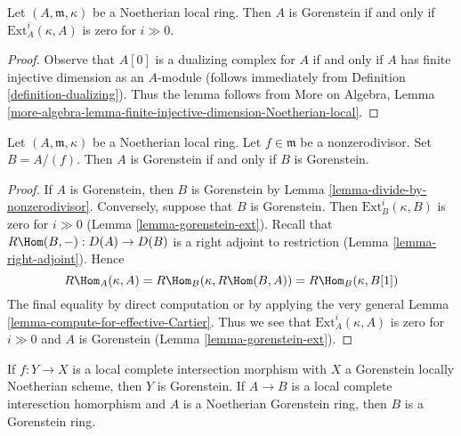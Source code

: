 \begin{lemma}
\label{lemma-gorenstein-ext}
Let $(A, \mathfrak m, \kappa)$ be a Noetherian local ring.
Then $A$ is Gorenstein if and only if $\text{Ext}^i_A(\kappa, A)$
is zero for $i \gg 0$.
\end{lemma}

\begin{proof}
Observe that $A[0]$ is a dualizing complex for $A$ if and only
if $A$ has finite injective dimension as an $A$-module
(follows immediately from Definition \ref{definition-dualizing}).
Thus the lemma follows from More on Algebra, Lemma
\ref{more-algebra-lemma-finite-injective-dimension-Noetherian-local}.
\end{proof}

\begin{lemma}
\label{lemma-gorenstein-divide-by-nonzerodivisor}
Let $(A, \mathfrak m, \kappa)$
be a Noetherian local ring. Let $f \in \mathfrak m$ be a
nonzerodivisor. Set $B = A/(f)$. Then $A$ is Gorenstein if and
only if $B$ is Gorenstein.
\end{lemma}

\begin{proof}
If $A$ is Gorenstein, then $B$ is Gorenstein by
Lemma \ref{lemma-divide-by-nonzerodivisor}.
Conversely, suppose that $B$ is Gorenstein. Then
$\text{Ext}^i_B(\kappa, B)$ is zero for $i \gg 0$
(Lemma \ref{lemma-gorenstein-ext}).
Recall that $R\Hom(B, -) : D(A) \to D(B)$ is a right adjoint
to restriction (Lemma \ref{lemma-right-adjoint}).
Hence
$$
R\Hom_A(\kappa, A) = R\Hom_B(\kappa, R\Hom(B, A)) =
R\Hom_B(\kappa, B[1])
$$
The final equality by direct computation or by applying the
very general Lemma \ref{lemma-compute-for-effective-Cartier}.
Thus we see that $\text{Ext}^i_A(\kappa, A)$ is zero for
$i \gg 0$ and $A$ is Gorenstein (Lemma \ref{lemma-gorenstein-ext}).
\end{proof}

\begin{lemma}
\label{lemma-gorenstein-lci}
If $f : Y \to X$ is a local complete intersection morphism
with $X$ a Gorenstein locally Noetherian scheme, then $Y$ is
Gorenstein. If $A \to B$ is a local complete interesction
homorphism and $A$ is a Noetherian Gorenstein ring, then
$B$ is a Gorenstein ring.
\end{lemma}

